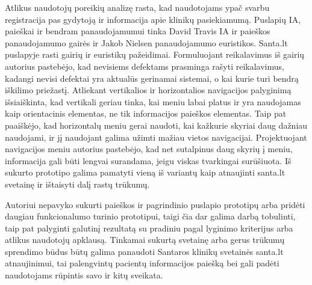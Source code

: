 \documentclass{VUMIFPSbakalaurinis}
\begin{document}
Atlikus naudotojų poreikių analizę rasta, kad naudotojams ypač svarbu registracija pas gydytoją ir informacija apie klinikų pasiekiamumą. Puslapių IA, paieškai ir bendram panaudojamumui tinka David Travis IA ir paieškos panaudojamumo gairės ir Jakob Nielsen panaudojamumo euristikos. Santa.lt puslapyje rasti gairių ir euristikų pažeidimai. Formuluojant reikalavimus iš gairių autorius pastebėjo, kad nevisiems defektams prasminga rašyti reikalavimus, kadangi nevisi defektai yra aktualūs gerinamai sistemai, o kai kurie turi bendrą iškilimo priežastį. Atliekant vertikalios ir horizontalios navigacijos palyginimą išsiaiškinta, kad vertikali geriau tinka, kai meniu labai platus ir yra naudojamas kaip orientacinis elementas, ne tik informacijos paieškos elementas. Taip pat paaiškėjo, kad horizontalų meniu gerai naudoti, kai kažkurie skyriai daug dažniau naudojami, ir jį naudojant galima užimti mažiau vietos navigacijai. Projektuojant navigacijos meniu autorius pastebėjo, kad net sutalpinus daug skyrių į meniu, informacija gali būti lengvai surandama, jeigu viskas tvarkingai surūšiuota. Iš sukurto prototipo galima pamatyti vieną iš variantų kaip atnaujinti santa.lt svetainę ir ištaisyti dalį rastų trūkumų.

Autoriui nepavyko sukurti paieškos ir pagrindinio puslapio prototipų arba pridėti daugiau funkcionalumo turinio prototipui, taigi čia dar galima darbą tobulinti, taip pat palyginti galutinį rezultatą su pradiniu pagal lyginimo kriterijus arba atlikus naudotojų apklausą. Tinkamai sukurtą svetainę arba gerus trūkumų sprendimo būdus būtų galima panaudoti Santaros klinikų svetainės santa.lt atnaujinimui, tai palengvintų pacientų informacijos paiešką bei gali padėti naudotojams rūpintis savo ir kitų sveikata.



\printbibliography[heading=bibintoc, title=Šaltiniai]  %
\end{document}
